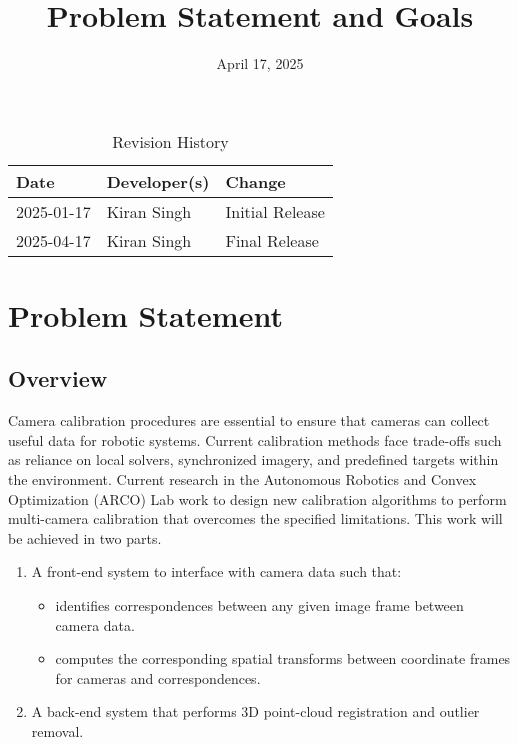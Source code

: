 \documentclass{article}
\title{Problem Statement and Goals\\\progname}
\author{\authname}
\date{April 17, 2025}
\begin{document}
\maketitle

\begin{table}[hp]
\caption{Revision History} \label{TblRevisionHistory}
\begin{tabularx}{\textwidth}{llX}
\toprule
\textbf{Date} & \textbf{Developer(s)} & \textbf{Change}\\
\midrule
2025-01-17 & Kiran Singh & Initial Release\\
2025-04-17 & Kiran Singh & Final Release\\

\bottomrule
\end{tabularx}
\end{table}

\section{Problem Statement}
\subsection{Overview}
Camera calibration procedures are essential to ensure that cameras can collect 
useful data for robotic systems. Current calibration methods face trade-offs 
such as reliance on local solvers, synchronized imagery, and predefined targets 
within the environment. Current research in the Autonomous Robotics and Convex 
Optimization (ARCO) Lab work to design new calibration algorithms to perform 
multi-camera calibration that overcomes the specified limitations. This work 
will be achieved in two parts.

\begin{enumerate}
    \item A front-end system to interface with camera data such that:

    \begin{itemize}
        \item identifies correspondences between any given image frame between 
        camera data.

        \item computes the corresponding spatial transforms 
        between coordinate frames for cameras and correspondences.
    \end{itemize}

    \item A back-end system that performs 3D point-cloud registration and 
    outlier removal.
\end{enumerate}  
\end{document}

